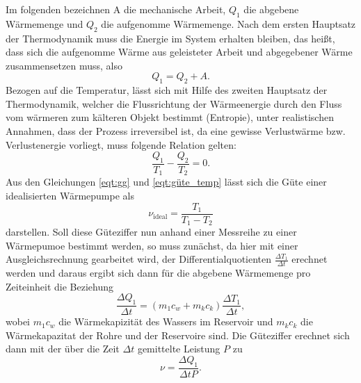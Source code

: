     Im folgenden bezeichnen A die mechanische Arbeit, $Q_1$ die abgebene Wärmemenge und $Q_2$ die aufgenomme Wärmemenge. 
    Nach dem ersten Hauptsatz der Thermodynamik muss die Energie im System erhalten bleiben, das heißt, dass sich die aufgenomme Wärme aus geleisteter Arbeit und abgegebener Wärme zusammensetzen muss, also
    \begin{equation}
      \label{eqt:gg}
      Q_1 = Q_2 + A .
    \end{equation}
    Bezogen auf die Temperatur, lässt sich mit Hilfe des zweiten Hauptsatz der Thermodynamik, welcher die Flussrichtung der Wärmeenergie durch den Fluss vom wärmeren zum kälteren Objekt bestimmt (Entropie), unter realistischen Annahmen,
    dass der Prozess irreversibel ist, da eine gewisse Verlustwärme bzw. Verlustenergie vorliegt,  
    muss folgende Relation gelten:
    \begin{equation}
      \label{eqt:güte_temp}
      \frac{Q_1}{T_1} - \frac{Q_2}{T_2} = 0 .
    \end{equation}
    Aus den Gleichungen \ref{eqt:gg} und \ref{eqt:güte_temp} lässt sich die Güte einer idealisierten Wärmepumpe als
    \begin{equation}
      \label{eqt:Güte}
      \nu_\text{ideal} = \frac {T_1}{T_1 - T_2}
    \end{equation}
    darstellen.
    Soll diese Güteziffer nun anhand einer Messreihe zu einer Wärmepumoe bestimmt werden, so muss zunächst, da hier mit einer Ausgleichsrechnung gearbeitet wird, der Differentialquotienten $\frac{\Delta T_1}{\Delta t }$
    erechnet werden und daraus ergibt sich dann für die abgebene Wärmemenge pro Zeiteinheit die Beziehung
    \begin{equation}
      \label{eqt:wärme_zeit}
      \frac{\Delta Q_1} {\Delta t} = (m_1 c_w + m_k c_k) \frac {\Delta T_1}{\Delta t},
    \end{equation}
    wobei $m_1 c_w$ die Wärmekapizität des Wassers im Reservoir und $m_k c_k$ die Wärmekapazitat der Rohre und der Reservoire sind.
    Die Güteziffer erechnet sich dann mit der über die Zeit $\Delta t$ gemittelte Leistung $P$ zu
    \begin{equation}
      \label{eqt:güte}
      \nu = \frac {\Delta Q_1}{\Delta t P}.
    \end{equation}
